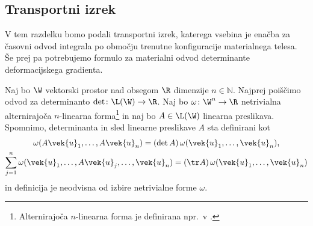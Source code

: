 \subsection{Transportni izrek}


V tem razdelku bomo podali transportni izrek, katerega vsebina je
enačba za časovni odvod integrala po območju trenutne konfiguracije materialnega telesa.
Še prej pa potrebujemo formulo za materialni odvod determinante deformacijskega gradienta.

Naj bo $\W$ vektorski prostor nad obsegom $\R$ dimenzije $n\in\mathbb{N}$.
Najprej poiščimo odvod za determinanto $\det\colon\L(\W)\to\R$.
Naj bo $\omega\colon \W^n\to\R$ netrivialna alternirajoča $n$-linearna forma\footnote{
Alternirajoča $n$-linearna forma je definirana npr.~v \cite[str.~246]{liu}.}
in naj bo $A\in\L(\W)$ linearna preslikava.
Spomnimo, determinanta in sled linearne preslikave $A$ sta definirani kot
\begin{gather*}
	\omega(A\vek{u}_1,\dots,A\vek{u}_n)=(\det A)\,\omega(\vek{u}_1,\dots,\vek{u}_n), \\
	\sum_{j=1}^n\omega(\vek{u}_1,\dots,A\vek{u}_j,\dots,\vek{u}_n)=(\tr A)\,\omega(\vek{u}_1,\dots,\vek{u}_n)
\end{gather*}
in definicija je neodvisna od izbire netrivialne forme $\omega$.

